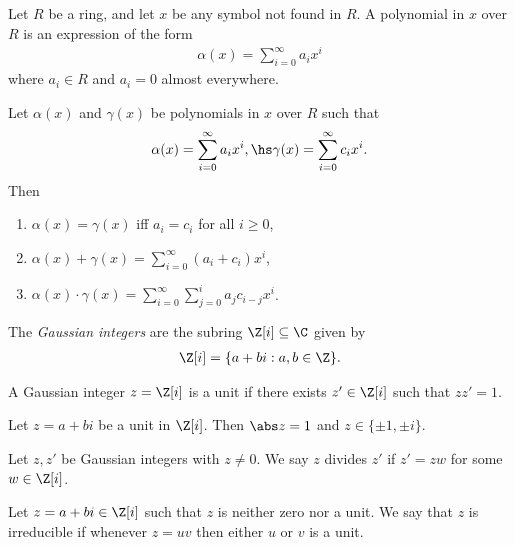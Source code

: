 \documentclass{article}
\begin{document}
\begin{definition}
    Let $R$ be a ring, and let $x$ be any symbol not found in $R$. A polynomial in $x$ over $R$ 
    is an expression of the form 
    \begin{align*}
        \alpha(x)=\sum_{i=0}^\infty a_ix^i
    \end{align*}
    where $a_i\in R$ and $a_i=0$ almost everywhere.
\end{definition}

\begin{definition}
    Let $\alpha(x)$ and $\gamma(x)$ be polynomials in $x$ over $R$ such that 
    \begin{align*}
        \alpha(x)=\sum_{i=0}^\infty a_ix^i,\hs
        \gamma(x)=\sum_{i=0}^\infty c_ix^i.
    \end{align*}
    Then \begin{enumerate}
        \item $\alpha(x)=\gamma(x)$ iff $a_i=c_i$ for all $i\geq 0$,
        \item $\alpha(x)+\gamma(x)=\sum_{i=0}^\infty (a_i+c_i)x^i$,
        \item $\alpha(x)\cdot\gamma(x)=\sum_{i=0}^\infty \sum_{j=0}^i a_jc_{i-j}x^i$.
    \end{enumerate}
\end{definition}

\begin{definition}
    The \emph{Gaussian integers} are the subring $\Z[i]\subseteq\C$ given by 
    \begin{align*}
        \Z[i]=\{a+bi:a,b\in\Z\}.
    \end{align*}
\end{definition}

\begin{definition}
    A Gaussian integer $z=\Z[i]$ is a unit if there exists $z'\in\Z[i]$ such that 
    $zz'=1$.
\end{definition}

\begin{lemma}[Lecture 13]
    Let $z=a+bi$ be a unit in $\Z[i]$. Then $\abs z=1$ and $z\in\{\pm 1, \pm i\}$.
\end{lemma}

\begin{definition}
    Let $z,z'$ be Gaussian integers with $z\not=0$. We say $z$ divides $z'$ if $z'=zw$ for 
    some $w\in\Z[i]$.
\end{definition}

\begin{definition}
    Let $z=a+bi\in\Z[i]$ such that $z$ is neither zero nor a unit. We say that $z$ is irreducible 
    if whenever $z=uv$ then either $u$ or $v$ is a unit.
\end{definition}
\end{document}
